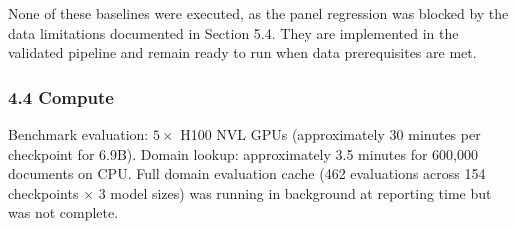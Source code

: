 None of these baselines were executed, as the panel regression was blocked by the data limitations documented in Section 5.4. They are implemented in the validated pipeline and remain ready to run when data prerequisites are met.

\subsubsection{4.4 Compute}

Benchmark evaluation: $5\times$ H100 NVL GPUs (approximately 30 minutes per checkpoint for 6.9B). Domain lookup: approximately 3.5 minutes for 600,000 documents on CPU. Full domain evaluation cache (462 evaluations across 154 checkpoints $\times$ 3 model sizes) was running in background at reporting time but was not complete.

